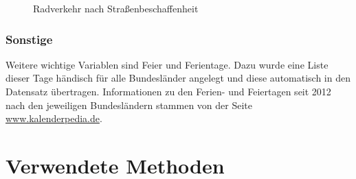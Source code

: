 \documentclass[a4paper,12pt]{thesis}
\begin{document}
\begin{figure}[!ht]%
	\centering
	\qquad
	\caption{Radverkehr nach Straßenbeschaffenheit}
	\label{VerkehrnachTypen}%
\end{figure}

\subsection{Sonstige}

Weitere wichtige Variablen sind Feier und Ferientage. Dazu wurde eine Liste dieser Tage händisch für alle Bundesländer angelegt und diese automatisch in den Datensatz übertragen. Informationen zu den Ferien- und Feiertagen seit 2012 nach den jeweiligen Bundesländern stammen von der Seite \url{www.kalenderpedia.de}.

\chapter{Verwendete Methoden}
\end{document}
